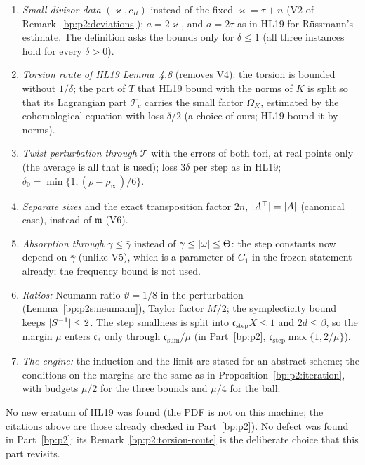 \begin{remark}\label{bp:p2s:deviations}
\begin{enumerate}[label=(S\arabic*)]
\item\label{bp:p2s:S1} \emph{Small-divisor data} $(\varkappa,c_R)$ instead of the fixed $\varkappa=\tau+n$ (V2 of Remark~\ref{bp:p2:deviations});
  $a=2\varkappa$, and $a=2\tau$ as in HL19 for R\"ussmann's estimate. The definition asks the bounds only for $\delta\le1$ (all three
  instances hold for every $\delta>0$).
\item\label{bp:p2s:S2} \emph{Torsion route of HL19 Lemma~4.8} (removes V4): the torsion is bounded without $1/\delta$; the part of $T$ that HL19
  bound with the norms of $K$ is split so that its Lagrangian part $\mathcal T_c$ carries the small factor $\Omega_K$, estimated by the
  cohomological equation with loss $\delta/2$ (a choice of ours; HL19 bound it by norms).
\item\label{bp:p2s:S3} \emph{Twist perturbation through $\mathcal T$} with the errors of both tori, at real points only (the average is all that is
  used); loss $3\delta$ per step as in HL19; $\delta_0=\min\{1,(\rho-\rho_\infty)/6\}$.
\item\label{bp:p2s:S4} \emph{Separate sizes} and the exact transposition factor $2n$, $\lvert A^\top\rvert=\lvert A\rvert$ (canonical case), instead of $\mathfrak m$ (V6).
\item\label{bp:p2s:S5} \emph{Absorption through $\gamma\le\bar\gamma$} instead of $\gamma\le\lvert \omega\rvert\le\Theta$: the step constants now depend on $\bar\gamma$
  (unlike V5), which is a parameter of $C_1$ in the frozen statement already; the frequency bound is not used.
\item\label{bp:p2s:S6} \emph{Ratios:} Neumann ratio $\vartheta=1/8$ in the perturbation (Lemma~\ref{bp:p2s:neumann}), Taylor factor $M/2$; the
  symplecticity bound keeps $\lvert S^{-1}\rvert\le2$. The step smallness is split into $\mathfrak c_{\mathrm{step}}X\le1$ and $2d\le\beta$, so the
  margin $\mu$ enters $\mathfrak c_*$ only through $\mathfrak c_{\mathrm{sum}}/\mu$ (in Part~\ref{bp:p2}, $\mathfrak c_{\mathrm{step}}\max\{1,2/\mu\}$).
\item\label{bp:p2s:S7} \emph{The engine:} the induction and the limit are stated for an abstract scheme; the conditions on the margins are the
  same as in Proposition~\ref{bp:p2:iteration}, with budgets $\mu/2$ for the three bounds and $\mu/4$ for the ball.
\end{enumerate}
No new erratum of HL19 was found (the PDF is not on this machine; the citations above are those already checked in Part~\ref{bp:p2}). No
defect was found in Part~\ref{bp:p2}: its Remark~\ref{bp:p2:torsion-route} is the deliberate choice that this part revisits.
\end{remark}
